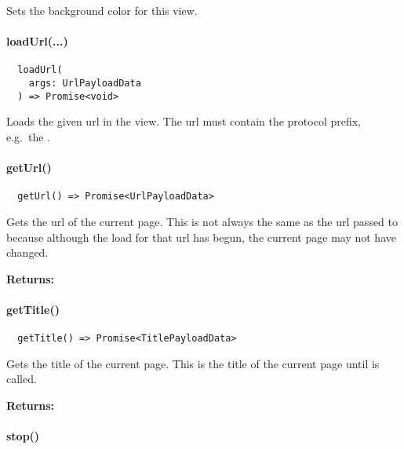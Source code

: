 Sets the background color for this view.


\paragraph{loadUrl(...)}

\begin{verbatim}
  loadUrl(
    args: UrlPayloadData
  ) => Promise<void>
\end{verbatim}

Loads the given url in the view.
The url must contain the protocol prefix, e.g.\ the .


\newpage

\paragraph{getUrl()}

\begin{verbatim}
  getUrl() => Promise<UrlPayloadData>
\end{verbatim}

Gets the \ac{url} of the current page.
This is not always the same as the \ac{url} passed to 
because although the load for that \ac{url} has begun, the current page may not have changed.

\textbf{Returns:} 


\paragraph{getTitle()}

\begin{verbatim}
  getTitle() => Promise<TitlePayloadData>
\end{verbatim}

Gets the title of the current page.
This is the title of the current page until  is called.

\textbf{Returns:} 


\paragraph{stop()}


